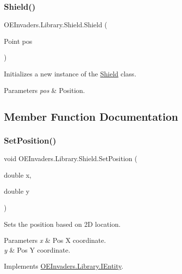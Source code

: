 \subsubsection{\texorpdfstring{Shield()}{Shield()}}
{\footnotesize\ttfamily O\+E\+Invaders.\+Library.\+Shield.\+Shield (\begin{DoxyParamCaption}\item[{Point}]{pos }\end{DoxyParamCaption})}



Initializes a new instance of the \mbox{\hyperlink{class_o_e_invaders_1_1_library_1_1_shield}{Shield}} class. 


\begin{DoxyParams}{Parameters}
{\em pos} & Position.\\
\hline
\end{DoxyParams}


\subsection{Member Function Documentation}
\mbox{\label{class_o_e_invaders_1_1_library_1_1_shield_ae53b795e54cc3b6f985f8cc823811353}} 
\subsubsection{\texorpdfstring{SetPosition()}{SetPosition()}}
{\footnotesize\ttfamily void O\+E\+Invaders.\+Library.\+Shield.\+Set\+Position (\begin{DoxyParamCaption}\item[{double}]{x,  }\item[{double}]{y }\end{DoxyParamCaption})}



Sets the position based on 2D location. 


\begin{DoxyParams}{Parameters}
{\em x} & Pos X coordinate.\\
\hline
{\em y} & Pos Y coordinate.\\
\hline
\end{DoxyParams}


Implements \mbox{\hyperlink{interface_o_e_invaders_1_1_library_1_1_i_entity_ae2cf61539ba662a6793fef01abcad2ef}{O\+E\+Invaders.\+Library.\+I\+Entity}}.



